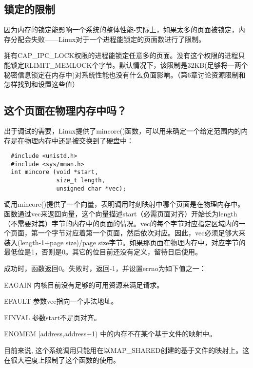 \subsection{锁定的限制}

因为内存的锁定能影响一个系统的整体性能-实际上，如果太多的页面被锁定，内存分配会失败------Linux对于一个进程能锁定的页面数进行了限制。

拥有CAP\_IPC\_LOCK权限的进程能锁定任意多的页面。没有这个权限的进程只能锁定RLIMIT\_MEMLOCK个字节。默认情况下，该限制是32KB(足够将一两个秘密信息锁定在内存中)对系统性能也没有什么负面影响。（第6章讨论资源限制和怎样找到和设置这些值） 

\subsection{这个页面在物理内存中吗？}

出于调试的需要，Linux提供了mincore()函数，可以用来确定一个给定范围内的内存是在物理内存中还是被交换到了硬盘中： 

\begin{lstlisting}
  #include <unistd.h>
  #include <sys/mman.h>
  int mincore (void *start,
               size_t length,
               unsigned char *vec);
\end{lstlisting}

调用mincore()提供了一个向量，表明调用时刻映射中哪个页面是在物理内存中。函数通过vec来返回向量，这个向量描述start（必需页面对齐）开始长为length（不需要对其）字节的内存中的页面的情况。vec的每个字节对应指定区域内的一个页面，第一个字节对应着第一个页面，然后依次对应。因此，vec必须足够大来装入(length-1+page size)/page size字节。如果那页面在物理内存中，对应字节的最低位是1，否则是0。其它的位目前还没有定义，留待日后使用。

成功时，函数返回0。失败时，返回-1，并设置errno为如下值之一： 

\begin{eqlist*}
\item[EAGAIN] 内核目前没有足够的可用资源来满足请求。
\item[EFAULT] 参数vec指向一个非法地址。
\item[EINVAL] 参数start不是页对齐。
\item[ENOMEM] [address,address+1) 中的内存不在某个基于文件的映射中。
\end{eqlist*}

目前来说, 这个系统调用只能用在以MAP\_SHARED创建的基于文件的映射上。这在很大程度上限制了这个函数的使用。 

